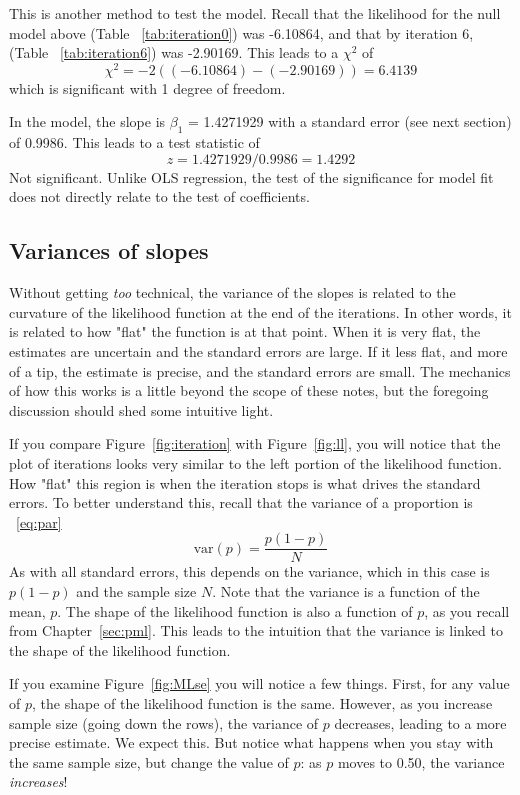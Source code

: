 This is another method to test the model. Recall that the likelihood for the null model above (Table ~\ref{tab:iteration0}) was -6.10864, and that by iteration 6, (Table ~\ref{tab:iteration6}) was -2.90169. This leads to a $\chi^2$ of
\[
\chi^2 = -2((-6.10864)-(-2.90169)) = 6.4139
\]
which is significant with 1 degree of freedom.

In the model, the slope is $\beta_1$ = 1.4271929 with a standard error (see next section) of 0.9986. This leads to a test statistic of
\[
z = 1.4271929/0.9986 = 1.4292
\]
Not significant. Unlike OLS regression, the test of the significance for model fit does not directly relate to the test of coefficients.

\subsection{Variances of slopes}

Without getting {\it too} technical, the variance of the slopes is related to the curvature of the likelihood function at the end of the iterations. In other words, it is related to how "flat" the function is at that point. When it is very flat, the estimates are uncertain and the standard errors are large. If it less flat, and more of a tip, the estimate is precise, and the standard errors are small. The mechanics of how this works is a little beyond the scope of these notes, but the foregoing discussion should shed some intuitive light.

If you compare Figure~\ref{fig:iteration} with Figure~\ref{fig:ll}, you will notice that the plot of iterations looks very similar to the left portion of the likelihood function. How "flat" this region is when the iteration stops is what drives the standard errors. To better understand this, recall that the variance of a proportion is ~\eqref{eq:par}
\[
\mbox{var}\left(p\right) = \frac{p\left(1-p\right)}{N}
\]
As with all standard errors, this depends on the variance, which in this case is $p\left(1-p\right)$ and the sample size $N$. Note that the variance is a function of the mean, $p$. The shape of the likelihood function is also a function of $p$, as you recall from Chapter~\ref{sec:pml}. This leads to the intuition that the variance is linked to the shape of the likelihood function.

If you examine Figure~\ref{fig:MLse} you will notice a few things. First, for any value of $p$, the shape of the likelihood function is the same. However, as you increase sample size (going down the rows), the variance of $p$ decreases, leading to a more precise estimate. We expect this. But notice what happens when you stay with the same sample size, but change the value of $p$: as $p$ moves to 0.50, the variance {\it increases}!

